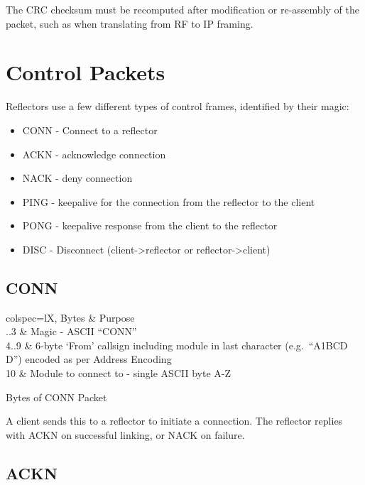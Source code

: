 \documentclass[a4paper,11pt]{book}
\begin{document}
The CRC checksum must be recomputed after modification or re-assembly of the packet, such as when translating from RF to IP framing.

\section{Control Packets}

Reflectors use a few different types of control frames, identified by
their magic:

\begin{itemize}
	\item
	CONN - Connect to a reflector
	\item
	ACKN - acknowledge connection
	\item
	NACK - deny connection
	\item
	PING - keepalive for the connection from the reflector to the client
	\item
	PONG - keepalive response from the client to the reflector
	\item
	DISC - Disconnect (client-\textgreater reflector or
	reflector-\textgreater client)
\end{itemize}

\subsection{CONN}

\begin{table}[H]
	\centering
	\begin{tblr}{
		colspec={lX},
		}
		\hline
		Bytes & Purpose \\
		..3 & Magic - ASCII ``CONN'' \\
		4..9 & 6-byte `From' callsign including module in last character (e.g.~``A1BCD D'') encoded as per Address Encoding \\
		10 & Module to connect to - single ASCII byte A-Z \\
		\hline[2px]
	\end{tblr}
	\caption{Bytes of CONN Packet}
\end{table}

A client sends this to a reflector to initiate a connection. The reflector replies with ACKN on successful linking, or NACK on failure.

\subsection{ACKN}
\end{document}
